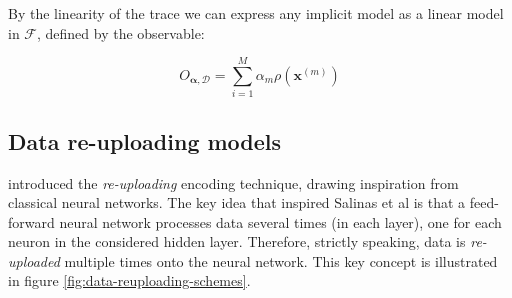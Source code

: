 By the linearity of the trace we can express any implicit model as a linear model in $\mathcal{F}$, defined by the 
observable:

\begin{equation}
    O_{\bm{\alpha}, \mathcal{D}} = \sum_{i=1}^M \alpha_m \rho(\bm{x}^{(m)})
\end{equation}


\subsection{Data re-uploading models}

\cite{Perez_reuploading} introduced the \textit{re-uploading} encoding technique,
drawing inspiration from classical neural networks.
The key idea that inspired Salinas et al is that a feed-forward neural network processes data several times
(in each layer), one for each neuron in the considered hidden layer. 
Therefore, strictly speaking, data is \textit{re-uploaded} multiple times onto the neural network.
This key concept is illustrated in figure \ref{fig:data-reuploading-schemes}.

